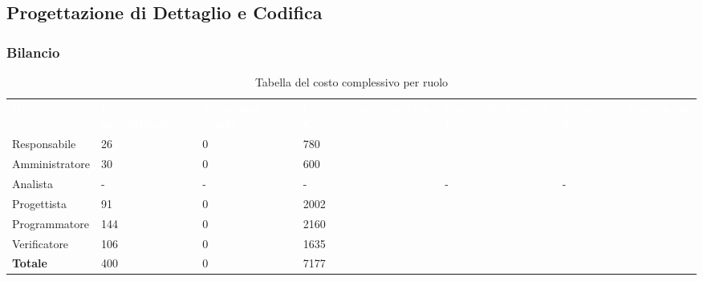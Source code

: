 \subsection{Progettazione di Dettaglio e Codifica}
\subsubsection{Bilancio}

{
\renewcommand{\arraystretch}{2}
\begin{longtable}[h]{ C{2.5cm} C{2.5cm} C{2.5cm} C{2.5cm} C{1.5cm} C{2.5cm}}
\caption{Tabella del costo complessivo per ruolo}\\

\textcolor{white}{\textbf{Ruolo}} & 
\textcolor{white}{\textbf{Ore preventivate}} & 
\textcolor{white}{\textbf{Variazione oraria}} & 
\textcolor{white}{\textbf{Costo preventivato (in \euro{})}} & 
\textcolor{white}{\textbf{Costo effettivo (in \euro{})}} & 
\textcolor{white}{\textbf{Variazione di costo (in \euro{})}}\\	
	
Responsabile    &  26 &  0 & 780 &   &   \\
Amministratore  &  30 &  0 & 600 &   &    \\
Analista        &  -  &  - &  -  & - &  - \\
Progettista     &  91 &  0 & 2002 &   &  \\
Programmatore   & 144 &  0 & 2160 &  &  \\
Verificatore    & 106 &  0 & 1635 &  &   \\
\textbf{Totale} & 400 &  0 & 7177 &  &  \\	

\end{longtable}
}

